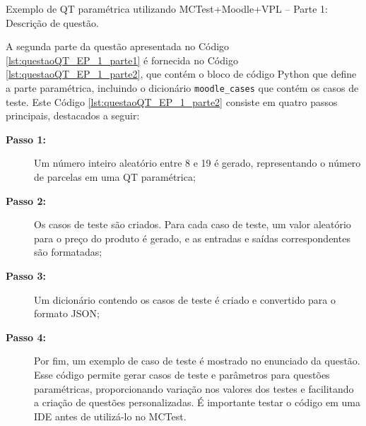 \begin{listing}[!ht]
\caption{Exemplo de QT paramétrica utilizando MCTest+Moodle+VPL -- Parte 1: Descrição de questão.}
\label{lst:questaoQT_EP_1_parte1}
\end{listing}


A segunda parte da questão apresentada no Código \ref{lst:questaoQT_EP_1_parte1} é fornecida no Código \ref{lst:questaoQT_EP_1_parte2}, que contém o bloco de código Python que define a parte paramétrica, incluindo o dicionário \verb|moodle_cases| que contém os casos de teste.
%
Este Código \ref{lst:questaoQT_EP_1_parte2} consiste em quatro passos principais, destacados a seguir:

\begin{description}
\item[\textbf{Passo 1:}] Um número inteiro aleatório entre 8 e 19 é gerado, representando o número de parcelas em uma QT paramétrica;
\item[\textbf{Passo 2:}] Os casos de teste são criados. Para cada caso de teste, um valor aleatório para o preço do produto é gerado, e as entradas e saídas correspondentes são formatadas;
\item[\textbf{Passo 3:}] Um dicionário contendo os casos de teste é criado e convertido para o formato JSON;
\item[\textbf{Passo 4:}] Por fim, um exemplo de caso de teste é mostrado no enunciado da questão. Esse código permite gerar casos de teste e parâmetros para questões paramétricas, proporcionando variação nos valores dos testes e facilitando a criação de questões personalizadas. É importante testar o código em uma IDE antes de utilizá-lo no MCTest.
\end{description}


